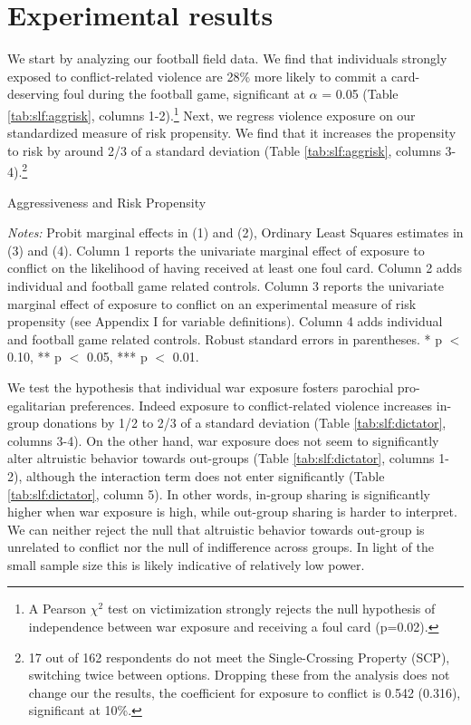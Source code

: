 \section{Experimental results}
\label{sec:slf:results}
We start by analyzing our football field data. We find that individuals strongly exposed to conflict-related violence are 28\% more likely to commit a card-deserving foul during the football game, significant at $\alpha$ = 0.05 (Table \ref{tab:slf:aggrisk}, columns 1-2).\footnote{A Pearson $\chi^2$ test on victimization strongly rejects the null hypothesis of independence between war exposure and receiving a foul card (p=0.02).}  Next, we regress violence exposure on our standardized measure of risk propensity. We find that it increases the propensity to risk by around 2/3 of a standard deviation (Table \ref{tab:slf:aggrisk}, columns 3-4).\footnote{17 out of 162 respondents do not meet the Single-Crossing Property (SCP), switching twice between options. Dropping these from the analysis does not change our the results, the coefficient for exposure to conflict is 0.542 (0.316), significant at 10\%.} 

\begin{threeparttable}[htb]
	\caption{Aggressiveness and Risk Propensity}
	\label{tab:slf:aggrisk}
	\centering
	\tiny
	
	\begin{tablenotes}
		\item \textit{Notes:} Probit marginal effects in (1) and (2), Ordinary Least Squares estimates in (3) and (4). Column 1 reports the univariate marginal effect of exposure to conflict on the likelihood of having received at least one foul card. Column 2 adds individual and football game related controls. Column 3 reports the univariate marginal effect of exposure to conflict on an experimental measure of risk propensity (see Appendix I for variable definitions). Column 4 adds individual and football game related controls. Robust standard errors in parentheses. * p $<$ 0.10, ** p $<$ 0.05, *** p $<$ 0.01.
		\item
	\end{tablenotes}
\end{threeparttable}

We test the hypothesis that individual war exposure fosters parochial pro-egalitarian preferences. Indeed exposure to conflict-related violence increases in-group donations by 1/2 to 2/3 of a standard deviation (Table \ref{tab:slf:dictator}, columns 3-4). On the other hand, war exposure does not seem to significantly alter altruistic behavior towards out-groups (Table \ref{tab:slf:dictator}, columns 1-2), although the interaction term does not enter significantly (Table \ref{tab:slf:dictator}, column 5). In other words, in-group sharing is significantly higher when war exposure is high, while out-group sharing is harder to interpret. We can neither reject the null that altruistic behavior towards out-group is unrelated to conflict nor the null of indifference across groups. In light of the small sample size this is likely indicative of relatively low power.

